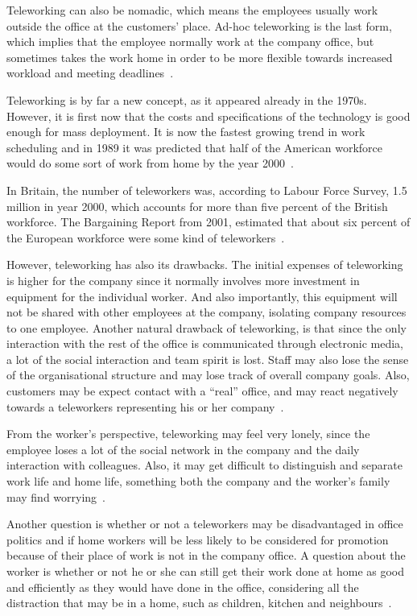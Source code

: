 \documentclass[a4paper,12pt,titlepage]{article}
\begin{document}
  Teleworking can also be nomadic, which means the employees usually
  work outside the office at the customers' place. Ad-hoc teleworking
  is the last form, which implies that the employee normally work at the
  company office, but sometimes takes the work home in order to be more
  flexible towards increased workload and meeting deadlines~\cite[92-93]{ahdb}.

  Teleworking is by far a new concept, as it appeared already in the 1970s.
  However, it is first now that the costs and specifications of
  the technology is good enough for mass deployment. It is now
  the fastest growing trend in work scheduling and in 1989 it
  was predicted that half of the American workforce would do some
  sort of work from home by the year 2000~\cite[540-541]{sr}.

  In Britain, the number of teleworkers was,
  according to Labour Force Survey, 1.5 million in year 2000, which
  accounts for more than five percent of the British workforce.
  The Bargaining Report from 2001, estimated that about six percent
  of the European workforce were some kind of teleworkers~\cite[40]{mnpb}.

  However, teleworking has also its drawbacks. The initial expenses of
  teleworking is higher for the company since it
  normally involves more investment in equipment for
  the individual worker. And also importantly, this equipment
  will not be shared with other employees at the company, isolating
  company resources to one employee.
  Another natural drawback of teleworking,
  is that since the only interaction with the
  rest of the office is communicated through electronic media, a lot 
  of the social interaction and team spirit is lost. Staff may also
  lose the sense of the organisational structure and may lose track
  of overall company goals. Also, customers may be expect contact
  with a ``real'' office, and may react negatively towards a teleworkers
  representing his or her company~\cite[95]{ahdb}.

  From the worker's perspective, teleworking may feel very lonely,
  since the employee loses a lot of the social network in the company
  and the daily interaction with colleagues. Also, it may get difficult
  to distinguish and separate work life and home life, something both
  the company and the worker's family may find worrying~\cite[40]{mnpb}.

  Another question is whether or not a teleworkers may be disadvantaged
  in office politics and if home workers will be less likely to be considered
  for promotion because of their place of work is not in the company office.
  A question about the worker is whether or not he or she can still get their work
  done at home as good and efficiently as they would have done in the office,
  considering all the distraction that may be in a home,
  such as children, kitchen and neighbours~\cite[341]{sr}. 
\end{document}
